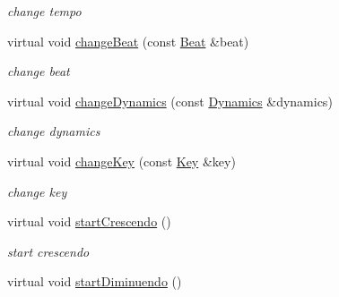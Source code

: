 \begin{DoxyCompactItemize}
\begin{DoxyCompactList}\small\item\em change tempo \end{DoxyCompactList}\item 
\hypertarget{classsinsy_1_1XmlWriter_aa7cda2d4ca24d8c44f7857ad07fdc12d}{virtual void \hyperlink{classsinsy_1_1XmlWriter_aa7cda2d4ca24d8c44f7857ad07fdc12d}{change\-Beat} (const \hyperlink{classsinsy_1_1Beat}{\-Beat} \&beat)}\label{classsinsy_1_1XmlWriter_aa7cda2d4ca24d8c44f7857ad07fdc12d}

\begin{DoxyCompactList}\small\item\em change beat \end{DoxyCompactList}\item 
\hypertarget{classsinsy_1_1XmlWriter_a9ed65ff1f8586a11e1e524f62c2feda0}{virtual void \hyperlink{classsinsy_1_1XmlWriter_a9ed65ff1f8586a11e1e524f62c2feda0}{change\-Dynamics} (const \hyperlink{classsinsy_1_1Dynamics}{\-Dynamics} \&dynamics)}\label{classsinsy_1_1XmlWriter_a9ed65ff1f8586a11e1e524f62c2feda0}

\begin{DoxyCompactList}\small\item\em change dynamics \end{DoxyCompactList}\item 
\hypertarget{classsinsy_1_1XmlWriter_ad5ced923386aa1be0a82745a1e337c14}{virtual void \hyperlink{classsinsy_1_1XmlWriter_ad5ced923386aa1be0a82745a1e337c14}{change\-Key} (const \hyperlink{classsinsy_1_1Key}{\-Key} \&key)}\label{classsinsy_1_1XmlWriter_ad5ced923386aa1be0a82745a1e337c14}

\begin{DoxyCompactList}\small\item\em change key \end{DoxyCompactList}\item 
\hypertarget{classsinsy_1_1XmlWriter_a7e8343646c0744f95da6afc0cd1208e5}{virtual void \hyperlink{classsinsy_1_1XmlWriter_a7e8343646c0744f95da6afc0cd1208e5}{start\-Crescendo} ()}\label{classsinsy_1_1XmlWriter_a7e8343646c0744f95da6afc0cd1208e5}

\begin{DoxyCompactList}\small\item\em start crescendo \end{DoxyCompactList}\item 
\hypertarget{classsinsy_1_1XmlWriter_af542af35a9d957caa4886ab182d9ac55}{virtual void \hyperlink{classsinsy_1_1XmlWriter_af542af35a9d957caa4886ab182d9ac55}{start\-Diminuendo} ()}\label{classsinsy_1_1XmlWriter_af542af35a9d957caa4886ab182d9ac55}


\end{DoxyCompactItemize}
